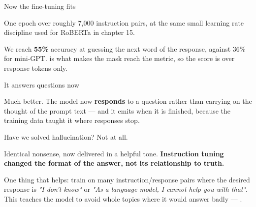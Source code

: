 \documentclass[aspectratio=169,11pt,t]{beamer}
\begin{document}
\begin{frame}[shrink=25]{Now the fine-tuning fits}
{\fontsize{9.4}{12.6}\selectfont\color{fg2}One epoch over roughly 7,000 instruction pairs, at the same small learning rate discipline used for RoBERTa in chapter 15.\par}\vskip 4pt
{\fontsize{9.4}{12.6}\selectfont\color{fg2}We reach \textbf{55\%} accuracy at guessing the next word of the response, against 36\% for mini-GPT.  is what makes the  mask reach the metric, so the score is over response tokens only.\par}\vskip 4pt
\end{frame}

\begin{frame}[shrink=25]{It answers questions now}
{\fontsize{9.4}{12.6}\selectfont\color{fg2}Much better. The model now \textbf{responds} to a question rather than carrying on the thought of the prompt text --- and it emits \inlinecode{[end]} when it is finished, because the training data taught it where responses stop.\par}\vskip 4pt
\end{frame}

\begin{frame}[shrink=25]{Have we solved hallucination? Not at all.}
{\fontsize{9.4}{12.6}\selectfont\color{fg2}Identical nonsense, now delivered in a helpful tone. \textbf{Instruction tuning changed the format of the answer, not its relationship to truth.}\par}\vskip 4pt
\begin{iband}[amber]
One thing that helps: train on many instruction/response pairs where the desired response is \textit{"I don't know"} or \textit{"As a language model, I cannot help you with that"}. This teaches the model to avoid whole topics where it would answer badly --- .
\end{iband}
\end{frame}

\end{document}
